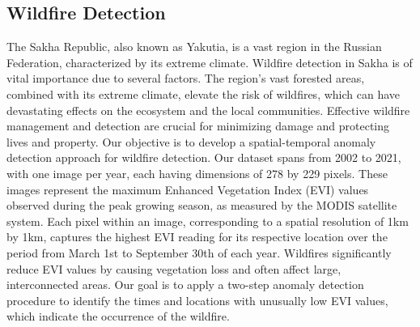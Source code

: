 \documentclass[11pt]{article}
\begin{document}
\subsection{Wildfire Detection}
The Sakha Republic, also known as Yakutia, is a vast region in the Russian Federation, characterized by its extreme climate. Wildfire detection in Sakha is of vital importance due to several factors. The region's vast forested areas, combined with its extreme climate, elevate the risk of wildfires, which can have devastating effects on the ecosystem and the local communities. Effective wildfire management and detection are crucial for minimizing damage and protecting lives and property. Our objective is to develop a spatial-temporal anomaly detection approach for wildfire detection. Our dataset spans from 2002 to 2021, with one image per year, each having dimensions of 278 by 229 pixels. These images represent the maximum Enhanced Vegetation Index (EVI) values observed during the peak growing season, as measured by the MODIS satellite system. Each pixel within an image, corresponding to a spatial resolution of 1km by 1km, captures the highest EVI reading for its respective location over the period from March 1st to September 30th of each year. Wildfires significantly reduce EVI values by causing vegetation loss and often affect large, interconnected areas. Our goal is to apply a two-step anomaly detection procedure to identify the times and locations with unusually low EVI values, which indicate the occurrence of the wildfire.
\end{document}
